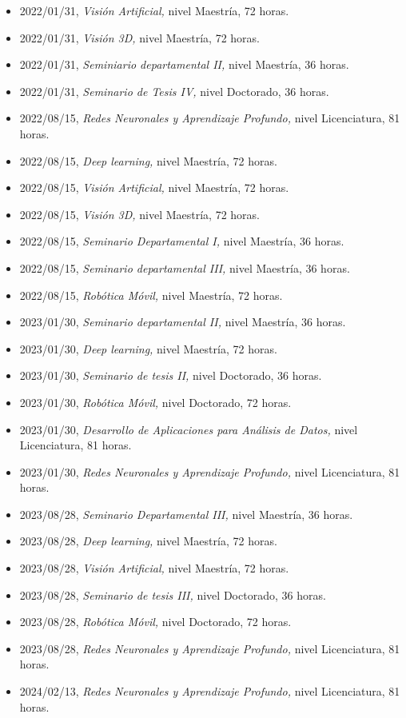 \begin{itemize} 
\item 2022/01/31, \textit{ Visión Artificial,} nivel Maestría, 72 horas. 
\item 2022/01/31, \textit{ Visión 3D,} nivel Maestría, 72 horas. 
\item 2022/01/31, \textit{ Seminiario departamental II,} nivel Maestría, 36 horas. 
\item 2022/01/31, \textit{ Seminario de Tesis IV,} nivel Doctorado, 36 horas. 
\item 2022/08/15, \textit{ Redes Neuronales y Aprendizaje Profundo,} nivel Licenciatura, 81 horas. 
\item 2022/08/15, \textit{ Deep learning,} nivel Maestría, 72 horas. 
\item 2022/08/15, \textit{ Visión Artificial,} nivel Maestría, 72 horas. 
\item 2022/08/15, \textit{ Visión 3D,} nivel Maestría, 72 horas. 
\item 2022/08/15, \textit{ Seminario Departamental I,} nivel Maestría, 36 horas. 
\item 2022/08/15, \textit{ Seminario departamental III,} nivel Maestría, 36 horas. 
\item 2022/08/15, \textit{ Robótica Móvil,} nivel Maestría, 72 horas. 
\item 2023/01/30, \textit{ Seminario departamental II,} nivel Maestría, 36 horas. 
\item 2023/01/30, \textit{ Deep learning,} nivel Maestría, 72 horas. 
\item 2023/01/30, \textit{ Seminario de tesis II,} nivel Doctorado, 36 horas. 
\item 2023/01/30, \textit{ Robótica Móvil,} nivel Doctorado, 72 horas. 
\item 2023/01/30, \textit{ Desarrollo de Aplicaciones para Análisis de Datos,} nivel Licenciatura, 81 horas. 
\item 2023/01/30, \textit{ Redes Neuronales y Aprendizaje Profundo,} nivel Licenciatura, 81 horas. 
\item 2023/08/28, \textit{ Seminario Departamental III,} nivel Maestría, 36 horas. 
\item 2023/08/28, \textit{ Deep learning,} nivel Maestría, 72 horas. 
\item 2023/08/28, \textit{ Visión Artificial,} nivel Maestría, 72 horas. 
\item 2023/08/28, \textit{ Seminario de tesis III,} nivel Doctorado, 36 horas. 
\item 2023/08/28, \textit{ Robótica Móvil,} nivel Doctorado, 72 horas. 
\item 2023/08/28, \textit{ Redes Neuronales y Aprendizaje Profundo,} nivel Licenciatura, 81 horas. 
\item 2024/02/13, \textit{ Redes Neuronales y Aprendizaje Profundo,} nivel Licenciatura, 81 horas. 
\end{itemize} 

